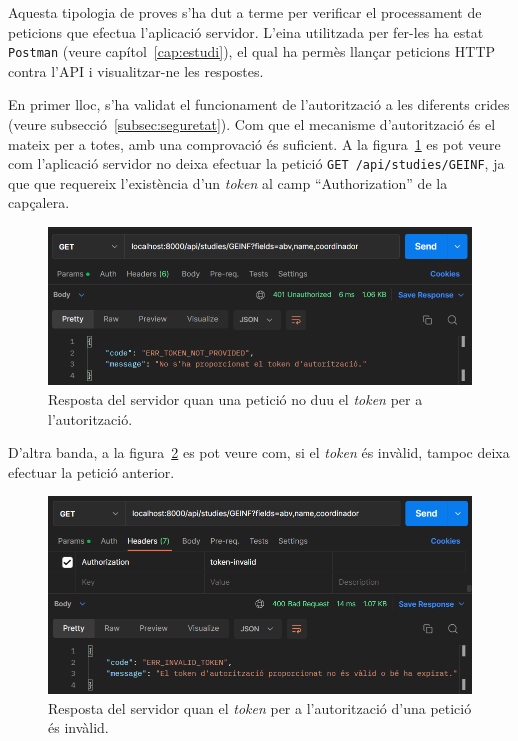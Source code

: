 \documentclass[a4paper,12pt]{ThesisStyle}
\begin{document}
Aquesta tipologia de proves s'ha dut a terme per verificar el processament de peticions que efectua l'aplicació servidor. L'eina utilitzada per fer-les ha estat \texttt{Postman} (veure capítol~\ref{cap:estudi}), el qual ha permès llançar peticions HTTP contra l'API i visualitzar-ne les respostes.

En primer lloc, s'ha validat el funcionament de l'autorització a les diferents crides (veure subsecció~\ref{subsec:seguretat}). Com que el mecanisme d'autorització és el mateix per a totes, amb una comprovació és suficient. A la figura~\ref{img:no_token} es pot veure com l'aplicació servidor no deixa efectuar la petició \texttt{GET /api/studies/GEINF}, ja que que requereix l'existència d'un \textit{token} al camp ``Authorization'' de la capçalera.

\begin{figure}[H]
  \centering
  \includegraphics[width=\textwidth]{assets/proves/noToken.png}
  \caption{\label{img:no_token} Resposta del servidor quan una petició no duu el \textit{token} per a l'autorització.}
\end{figure}

D'altra banda, a la figura~\ref{img:invalidToken} es pot veure com, si el \textit{token} és invàlid, tampoc deixa efectuar la petició anterior.

\begin{figure}[H]
  \centering
  \includegraphics[width=\textwidth]{assets/proves/invalidToken.png}
  \caption{\label{img:invalidToken} Resposta del servidor quan el \textit{token} per a l'autorització d'una petició és invàlid.}
\end{figure}
\end{document}
